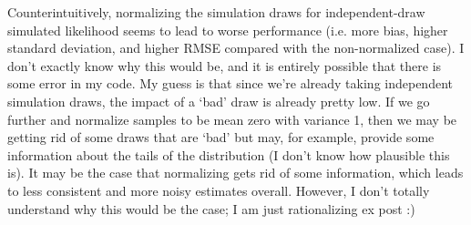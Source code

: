 \documentclass[12pt]{article}
\begin{document}
Counterintuitively, normalizing the simulation draws for independent-draw simulated likelihood seems to lead to worse performance (i.e. more bias, higher standard deviation, and higher RMSE compared with the non-normalized case). I don't exactly know why this would be, and it is entirely possible that there is some error in my code. My guess is that since we're already taking independent simulation draws, the impact of a `bad' draw is already pretty low. If we go further and normalize samples to be mean zero with variance 1, then we may be getting rid of some draws that are `bad' but may, for example, provide some information about the tails of the distribution (I don't know how plausible this is). It may be the case that normalizing gets rid of some information, which leads to less consistent and more noisy estimates overall. However, I don't totally understand why this would be the case; I am just rationalizing ex post :)






    
\end{document}

